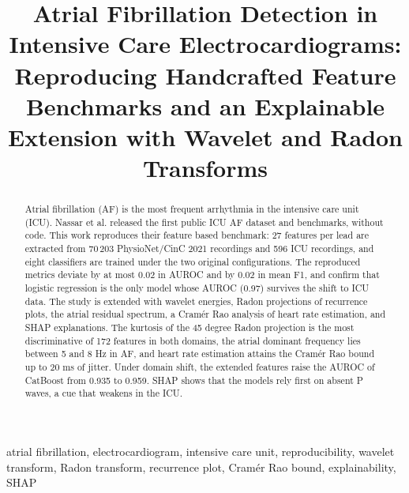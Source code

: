 \documentclass[conference,a4paper]{IEEEtran}
\begin{document}
\title{Atrial Fibrillation Detection in Intensive Care Electrocardiograms: Reproducing Handcrafted Feature Benchmarks and an Explainable Extension with Wavelet and Radon Transforms}

\author{
\and
{}
}

\maketitle

\begin{abstract}
Atrial fibrillation (AF) is the most frequent arrhythmia in the intensive care unit (ICU). Nassar et al. released the first public ICU AF dataset and benchmarks, without code. This work reproduces their feature based benchmark: 27 features per lead are extracted from 70\,203 PhysioNet/CinC 2021 recordings and 596 ICU recordings, and eight classifiers are trained under the two original configurations. The reproduced metrics deviate by at most 0.02 in AUROC and by 0.02 in mean F1, and confirm that logistic regression is the only model whose AUROC (0.97) survives the shift to ICU data. The study is extended with wavelet energies, Radon projections of recurrence plots, the atrial residual spectrum, a Cramér Rao analysis of heart rate estimation, and SHAP explanations. The kurtosis of the 45 degree Radon projection is the most discriminative of 172 features in both domains, the atrial dominant frequency lies between 5 and 8 Hz in AF, and heart rate estimation attains the Cramér Rao bound up to 20 ms of jitter. Under domain shift, the extended features raise the AUROC of CatBoost from 0.935 to 0.959. SHAP shows that the models rely first on absent P waves, a cue that weakens in the ICU.
\end{abstract}

\begin{IEEEkeywords}
atrial fibrillation, electrocardiogram, intensive care unit, reproducibility, wavelet transform, Radon transform, recurrence plot, Cramér Rao bound, explainability, SHAP
\end{IEEEkeywords}
\end{document}
